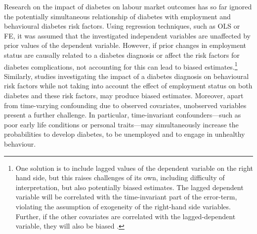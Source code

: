 Research on the impact of diabetes on labour market outcomes has so far ignored the potentially simultaneous relationship of diabetes with employment and behavioural diabetes risk factors. Using regression techniques, such as \ac{OLS} or \ac{FE}, it was assumed that the investigated independent variables are unaffected by prior values of the dependent variable. However, if prior changes in employment status are causally related to a diabetes diagnosis or affect the risk factors for diabetes complications, not accounting for this can lead to biased estimates.\footnote{One solution is to include lagged values of the dependent variable on the right hand side, but this raises challenges of its own, including difficulty of interpretation, but also potentially biased estimates. The lagged dependent variable will be correlated with the time-invariant part of the error-term, violating the assumption of exogeneity of the right-hand side variables. Further, if the other covariates are correlated with the lagged-dependent variable, they will also be biased \parencite{Anderson1982,Nickell1981}.} Similarly, studies investigating the impact of a diabetes diagnosis on behavioural risk factors while not taking into account the effect of employment status on both diabetes and these risk factors, may produce biased estimates. Moreover, apart from time-varying confounding due to observed covariates, unobserved variables present a further challenge. In particular, time-invariant confounders---such as poor early life conditions or personal traits---may simultaneously increase the probabilities to develop diabetes, to be unemployed and to engage in unhealthy behaviour. 

